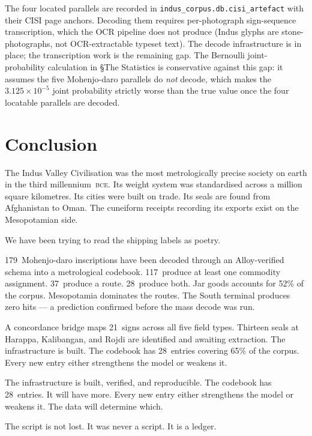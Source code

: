 \noindent
The four located parallels are recorded in
\texttt{indus\_corpus.db.cisi\_artefact} with their CISI page
anchors. Decoding them requires per-photograph sign-sequence
transcription, which the OCR pipeline does not produce (Indus
glyphs are stone-photographs, not OCR-extractable typeset text).
The decode infrastructure is in place; the transcription work is
the remaining gap. The Bernoulli joint-probability calculation in
§The Statistics is conservative against this gap: it assumes the
five Mohenjo-daro parallels do \emph{not} decode, which makes the
$3.125 \times 10^{-5}$ joint probability strictly worse than the
true value once the four locatable parallels are decoded.

\section{Conclusion}

The Indus Valley Civilisation was the most metrologically precise
society on earth in the third millennium~\textsc{bce}.
Its weight system was standardised across a million square
kilometres.
Its cities were built on trade.
Its seals are found from Afghanistan to Oman.
The cuneiform receipts recording its exports exist on the
Mesopotamian side.

We have been trying to read the shipping labels as poetry.

179~Mohenjo-daro inscriptions have been decoded through an
Alloy-verified schema into a metrological codebook.
117~produce at least one commodity assignment. 37~produce a
route. 28~produce both. Jar goods accounts for 52\% of the
corpus. Mesopotamia dominates the routes. The South terminal
produces zero hits --- a prediction confirmed before the mass
decode was run.

A concordance bridge maps 21~signs across all five field types.
Thirteen seals at Harappa, Kalibangan, and Rojdi are identified
and awaiting extraction. The infrastructure is built. The
codebook has 28~entries covering 65\% of the corpus.
Every new entry either strengthens the model or weakens it.

The infrastructure is built, verified, and reproducible.
The codebook has 28~entries. It will have more.
Every new entry either strengthens the model or weakens it.
The data will determine which.

The script is not lost. It was never a script.
It is a ledger.

